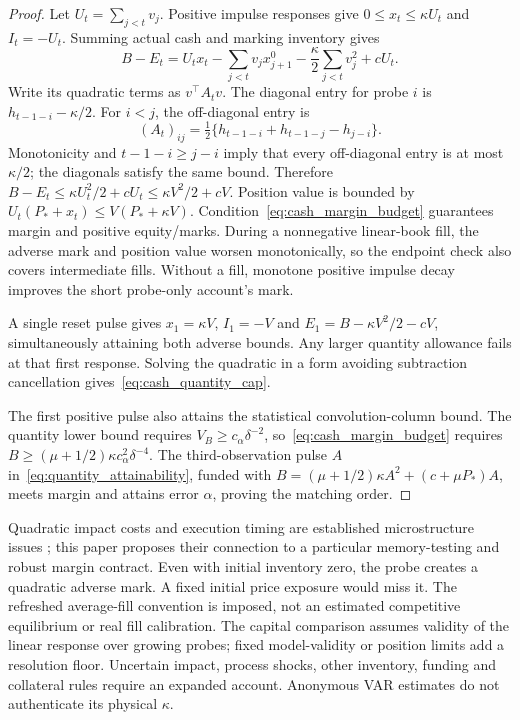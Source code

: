 \begin{proof}
Let $U_t=\sum_{j<t}v_j$. Positive impulse responses give $0\le x_t\le\kappa U_t$ and $I_t=-U_t$. Summing actual cash and marking inventory gives
\[
B-E_t=U_tx_t-\sum_{j<t}v_jx^0_{j+1}
-\frac\kappa2\sum_{j<t}v_j^2+cU_t.
\]
Write its quadratic terms as $v^\top A_tv$. The diagonal entry for probe $i$ is $h_{t-1-i}-\kappa/2$. For $i<j$, the off-diagonal entry is
\[
(A_t)_{ij}=\tfrac12\{h_{t-1-i}+h_{t-1-j}-h_{j-i}\}.
\]
Monotonicity and $t-1-i\ge j-i$ imply that every off-diagonal entry is at most $\kappa/2$; the diagonals satisfy the same bound. Therefore
$B-E_t\le\kappa U_t^2/2+cU_t\le\kappa V^2/2+cV$.
Position value is bounded by $U_t(P_*+x_t)\le V(P_*+\kappa V)$.
Condition~\eqref{eq:cash_margin_budget} guarantees margin and positive equity/marks. During a nonnegative linear-book fill, the adverse mark and position value worsen monotonically, so the endpoint check also covers intermediate fills. Without a fill, monotone positive impulse decay improves the short probe-only account's mark.

A single reset pulse gives $x_1=\kappa V$, $I_1=-V$ and $E_1=B-\kappa V^2/2-cV$, simultaneously attaining both adverse bounds. Any larger quantity allowance fails at that first response. Solving the quadratic in a form avoiding subtraction cancellation gives~\eqref{eq:cash_quantity_cap}.

The first positive pulse also attains the statistical convolution-column bound. The quantity lower bound requires $V_B\ge c_\alpha\delta^{-2}$, so~\eqref{eq:cash_margin_budget} requires $B\ge(\mu+1/2)\kappa c_\alpha^2\delta^{-4}$. The third-observation pulse $A$ in~\eqref{eq:quantity_attainability}, funded with $B=(\mu+1/2)\kappa A^2+(c+\mu P_*)A$, meets margin and attains error $\alpha$, proving the matching order.
\end{proof}

Quadratic impact costs and execution timing are established microstructure issues \citep{almgren2000}; this paper proposes their connection to a particular memory-testing and robust margin contract. Even with initial inventory zero, the probe creates a quadratic adverse mark. A fixed initial price exposure would miss it. The refreshed average-fill convention is imposed, not an estimated competitive equilibrium or real fill calibration. The capital comparison assumes validity of the linear response over growing probes; fixed model-validity or position limits add a resolution floor. Uncertain impact, process shocks, other inventory, funding and collateral rules require an expanded account. Anonymous VAR estimates do not authenticate its physical $\kappa$.

